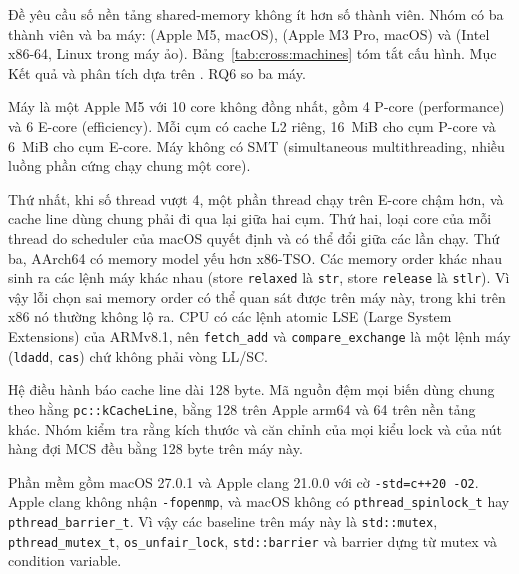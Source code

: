
Đề yêu cầu số nền tảng shared-memory không ít hơn số thành viên. Nhóm có ba thành viên và ba máy:
 (Apple M5, macOS),  (Apple M3 Pro, macOS) và 
(Intel x86-64, Linux trong máy ảo). Bảng~\ref{tab:cross:machines} tóm tắt cấu hình. Mục Kết quả và
phân tích dựa trên . RQ6 so ba máy.

Máy  là một Apple M5 với 10 core không đồng nhất, gồm 4 P-core (performance) và 6
E-core (efficiency). Mỗi cụm có cache L2 riêng, 16~MiB cho cụm P-core và 6~MiB cho cụm E-core. Máy
không có SMT (simultaneous multithreading, nhiều luồng phần cứng chạy chung một core).

Thứ nhất, khi số thread vượt 4, một phần thread chạy trên
E-core chậm hơn, và cache line dùng chung phải đi qua lại giữa hai cụm. Thứ hai, loại core của mỗi
thread do scheduler của macOS quyết định và có thể đổi giữa các lần chạy. Thứ ba, AArch64 có memory
model yếu hơn x86-TSO. Các memory order khác nhau sinh ra các lệnh máy khác nhau (store
\texttt{relaxed} là \texttt{str}, store \texttt{release} là \texttt{stlr}). Vì vậy lỗi chọn sai memory
order có thể quan sát được trên máy này, trong khi trên x86 nó thường không lộ ra. CPU có các lệnh
atomic LSE (Large System Extensions) của ARMv8.1, nên \texttt{fetch\_add} và \texttt{compare\_exchange} là một lệnh máy
(\texttt{ldadd}, \texttt{cas}) chứ không phải vòng LL/SC.

Hệ điều hành báo cache line dài 128 byte. Mã nguồn đệm mọi biến dùng chung theo hằng
\texttt{pc::kCacheLine}, bằng 128 trên Apple arm64 và 64 trên nền tảng khác. Nhóm kiểm tra rằng kích
thước và căn chỉnh của mọi kiểu lock và của nút hàng đợi MCS đều bằng 128 byte trên máy này.

Phần mềm gồm macOS 27.0.1 và Apple clang 21.0.0 với cờ \texttt{-std=c++20 -O2}. Apple clang không nhận
\texttt{-fopenmp}, và macOS không có \texttt{pthread\_spinlock\_t} hay \texttt{pthread\_barrier\_t}.
Vì vậy các baseline trên máy này là \texttt{std::mutex}, \texttt{pthread\_mutex\_t}, \texttt{os\_unfair\_lock},
\texttt{std::barrier} và barrier dựng từ mutex và condition variable.

